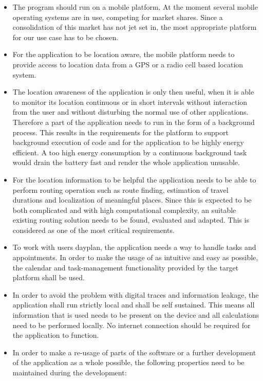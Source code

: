 \begin{itemize}
\item The program should run on a mobile platform. At the moment several mobile operating systems are in use, competing for market shares. Since a consolidation of this market has not jet set in, the most appropriate platform for our use case has to be chosen.
\item For the application to be location aware, the mobile platform needs to provide access to location data from a GPS or a radio cell based location system.
\item The location awareness of the application is only then useful, when it is able to monitor its location continuous or in short intervals without interaction from the user and without disturbing the normal use of other applications. Therefore a part of the application needs to run in the form of a background process. This results in the requirements for the platform to support background execution of code and for the application to be highly energy efficient. A too high energy consumption by a continuous background task would drain the battery fast and render the whole application unusable.
\item For the location information to be helpful the application needs to be able to perform routing operation such as route finding, estimation of travel durations and localization of meaningful places. Since this is expected to be both complicated and with high computational complexity, an suitable existing routing solution needs to be found, evaluated and adapted. This is considered as one of the most critical requirements. 
\item To work with users dayplan, the application needs a way to handle tasks and appointments. In order to make the usage of as intuitive and easy as possible, the calendar and task-management functionality provided by the target platform shall be used.
\item In order to avoid the problem with digital traces and information leakage, the application shall run strictly local and shall be self sustained. This means all information that is used needs to be present on the device and all calculations need to be performed locally. No internet connection should be required for the application to function.
\item In order to make a re-usage of parts of the software or a further development of the application as a whole possible, the following properties need to be maintained during the development:
	\begin{itemize}

\end{itemize}
\end{itemize}
